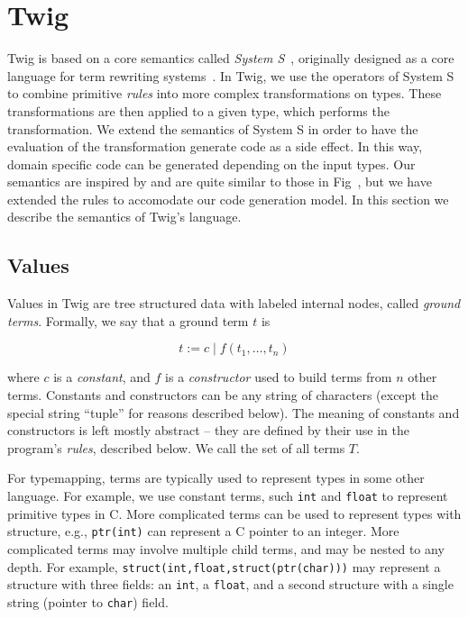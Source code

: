 
\section{Twig}
\label{sec:semantics}

Twig is based on a core semantics called \emph{System S}~\cite{system-s}, originally designed as a core language for term rewriting systems~\cite{baader98rewriting}. In Twig, we use the operators of System S to combine primitive \emph{rules} into more complex transformations on types. These transformations are then applied to a given type, which performs the transformation. We extend the semantics of System S in order to have the evaluation of the transformation generate code as a side effect. In this way, domain specific code can be generated depending on the input types. Our semantics are inspired by and are quite similar to those in Fig~\cite{fig}, but we have extended the rules to accomodate our code generation model. In this section we describe the semantics of Twig's language.

\subsection{Values}

Values in Twig are tree structured data with labeled internal nodes, called \emph{ground terms}. Formally, we say that a ground term $t$ is

\[
t \;\mbox{:=}\; c \;|\; f(t_1,\ldots,t_n)
\]

where $c$ is a \emph{constant}, and $f$ is a \emph{constructor} used to build terms from $n$ other terms. Constants and constructors can be any string of characters (except the special string ``tuple'' for reasons described below). The meaning of constants and constructors is left mostly abstract -- they are defined by their use in the program's \emph{rules}, described below. We call the set of all terms $T$.

For typemapping, terms are typically used to represent types in some other language. For example, we use constant terms, such \texttt{int} and \texttt{float} to represent primitive types in C. More complicated terms can be used to represent types with structure, e.g., \texttt{ptr(int)} can represent a C pointer to an integer. More complicated terms may involve multiple child terms, and may be nested to any depth. For example, \texttt{struct(int,float,struct(ptr(char)))} may represent a structure with three fields: an \texttt{int}, a \texttt{float}, and a second structure with a single string (pointer to \texttt{char}) field.

